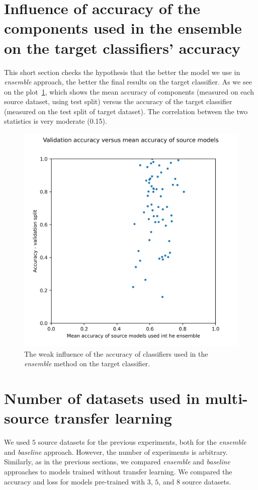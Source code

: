 \documentclass[a4paper,11pt,twoside]{report}
\theoremstyle{definition}
\begin{document}
\section{Influence of accuracy of the components used in the ensemble on the target classifiers' accuracy}
This short section checks the hypothesis that the better the model we use in \textit{ensemble} approach, the better the final results on the target classifier. As we see on the plot~\ref{fig:acc_source_vs_acc_target}, which shows the mean accuracy of components (measured on each source dataset, using test split) versus the accuracy of the target classifier (measured on the test split of target dataset). The correlation between the two statistics is very moderate (0.15).
\FloatBarrier
\begin{figure}[h!t]
\centering
\includegraphics[width=15cm]{imgs/ensemble/source_acc_vs_val.png}
\caption{The weak influence of the accuracy of classifiers used in the \textit{ensemble} method on the target classifier.}
\label{fig:acc_source_vs_acc_target}
\end{figure}
\FloatBarrier
\section{Number of datasets used in multi-source transfer learning}
We used $5$ source datasets for the previous experiments, both for the \textit{ensemble} and \textit{baseline} approach. However, the number of experiments is arbitrary. Similarly, as in the previous sections, we compared \textit{ensemble} and \textit{baseline} approaches to models trained without transfer learning. We compared the accuracy and loss for models pre-trained with $3$, $5$, and $8$ source datasets.
\end{document}

